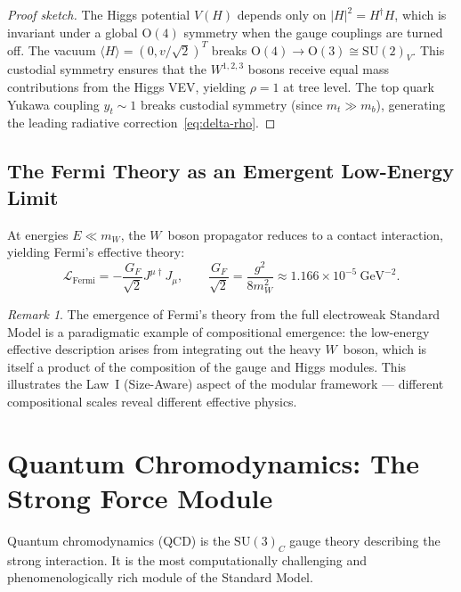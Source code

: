\documentclass[12pt]{article}
\theoremstyle{definition}
\theoremstyle{remark}
\newtheorem{remark}[theorem]{Remark}
\newcommand{\lag}{\mathcal{L}}
\newcommand{\su}[1]{\mathrm{SU}(#1)}
\newcommand{\vev}[1]{\langle #1 \rangle}
\begin{document}
\begin{proof}[Proof sketch]
The Higgs potential $V(H)$ depends only on $|H|^2 = H^\dagger H$, which is invariant under a global $\mathrm{O}(4)$ symmetry when the gauge couplings are turned off. The vacuum $\vev{H} = (0, v/\sqrt{2})^T$ breaks $\mathrm{O}(4) \to \mathrm{O}(3) \cong \su{2}_V$. This custodial symmetry ensures that the $W^{1,2,3}$ bosons receive equal mass contributions from the Higgs VEV, yielding $\rho = 1$ at tree level. The top quark Yukawa coupling $y_t \sim 1$ breaks custodial symmetry (since $m_t \gg m_b$), generating the leading radiative correction~\eqref{eq:delta-rho}.
\end{proof}

\subsection{The Fermi Theory as an Emergent Low-Energy Limit}

At energies $E \ll m_W$, the $W$~boson propagator reduces to a contact interaction, yielding Fermi's effective theory:
\begin{equation}
\label{eq:fermi}
\lag_{\mathrm{Fermi}} = -\frac{G_F}{\sqrt{2}} J^{\mu\dagger} J_\mu, \qquad \frac{G_F}{\sqrt{2}} = \frac{g^2}{8 m_W^2} \approx 1.166 \times 10^{-5}~\text{GeV}^{-2}.
\end{equation}

\begin{remark}
The emergence of Fermi's theory from the full electroweak Standard Model is a paradigmatic example of compositional emergence: the low-energy effective description arises from integrating out the heavy $W$~boson, which is itself a product of the composition of the gauge and Higgs modules. This illustrates the Law~I (Size-Aware) aspect of the modular framework --- different compositional scales reveal different effective physics.
\end{remark}


\section{Quantum Chromodynamics: The Strong Force Module}
\label{sec:qcd}

Quantum chromodynamics (QCD) is the $\su{3}_C$ gauge theory describing the strong interaction. It is the most computationally challenging and phenomenologically rich module of the Standard Model.
\end{document}
